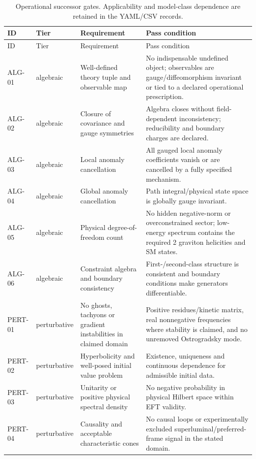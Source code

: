 \begingroup\scriptsize
\setlength\LTleft{0pt}\setlength\LTright{0pt}
\begin{longtable}{@{}p{0.9cm}p{1.25cm}p{3.15cm}p{7.7cm}@{}}
\caption{Operational successor gates. Applicability and model-class dependence are retained in the YAML/CSV records.}\label{tab:gates}\\
\toprule ID & Tier & Requirement & Pass condition\\\midrule\endfirsthead
\toprule ID & Tier & Requirement & Pass condition\\\midrule\endhead
ALG-01 & algebraic & Well-defined theory tuple and observable map & No indispensable undefined object; observables are gauge/diffeomorphism invariant or tied to a declared operational prescription. \\
ALG-02 & algebraic & Closure of covariance and gauge symmetries & Algebra closes without field-dependent inconsistency; reducibility and boundary charges are declared. \\
ALG-03 & algebraic & Local anomaly cancellation & All gauged local anomaly coefficients vanish or are cancelled by a fully specified mechanism. \\
ALG-04 & algebraic & Global anomaly cancellation & Path integral/physical state space is globally gauge invariant. \\
ALG-05 & algebraic & Physical degree-of-freedom count & No hidden negative-norm or overconstrained sector; low-energy spectrum contains the required 2 graviton helicities and SM states. \\
ALG-06 & algebraic & Constraint algebra and boundary consistency & First-/second-class structure is consistent and boundary conditions make generators differentiable. \\
PERT-01 & perturbative & No ghosts, tachyons or gradient instabilities in claimed domain & Positive residues/kinetic matrix, real nonnegative frequencies where stability is claimed, and no unremoved Ostrogradsky mode. \\
PERT-02 & perturbative & Hyperbolicity and well-posed initial value problem & Existence, uniqueness and continuous dependence for admissible initial data. \\
PERT-03 & perturbative & Unitarity or positive physical spectral density & No negative probability in physical Hilbert space within EFT validity. \\
PERT-04 & perturbative & Causality and acceptable characteristic cones & No causal loops or experimentally excluded superluminal/preferred-frame signal in the stated domain. \\

\end{longtable}
